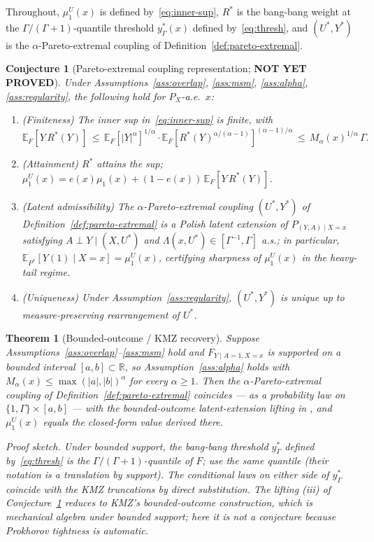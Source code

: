 \documentclass[11pt]{article}
\newcommand{\E}{\mathbb{E}}
\newcommand{\R}{\mathbb{R}}
\theoremstyle{definition}
\theoremstyle{plain}
\newtheorem{theorem}{Theorem}
\newtheorem{conjecture}{Conjecture}
\theoremstyle{remark}
\begin{document}
Throughout, $\mu_1^U(x)$ is defined by~\eqref{eq:inner-sup}, $R^*$ is the bang-bang weight at the $\Gamma/(\Gamma+1)$-quantile threshold $y_\Gamma^*(x)$ defined by~\eqref{eq:thresh}, and $(U^*, Y^*)$ is the $\alpha$-Pareto-extremal coupling of Definition~\ref{def:pareto-extremal}.

\begin{conjecture}[Pareto-extremal coupling representation; \textbf{NOT YET PROVED}]\label{conj:representation}
Under Assumptions~\ref{ass:overlap}, \ref{ass:msm}, \ref{ass:alpha}, \ref{ass:regularity}, the following hold for $P_X$-a.e.\ $x$:
\begin{enumerate}[label=(\roman*)]
  \item (Finiteness) The inner sup in~\eqref{eq:inner-sup} is finite, with
    \[ \E_F[Y\,R^*(Y)] \,\le\, \E_F[|Y|^\alpha]^{1/\alpha} \cdot \E_F\!\left[ R^*(Y)^{\alpha/(\alpha-1)} \right]^{(\alpha-1)/\alpha} \,\le\, M_\alpha(x)^{1/\alpha}\,\Gamma. \]
  \item (Attainment) $R^*$ attains the sup; $\mu_1^U(x) = e(x)\mu_1(x) + (1-e(x))\,\E_F[Y\,R^*(Y)]$.
  \item (Latent admissibility) The $\alpha$-Pareto-extremal coupling $(U^*, Y^*)$ of Definition~\ref{def:pareto-extremal} is a Polish latent extension of $P_{(Y, A) \mid X=x}$ satisfying $A \perp Y \mid (X, U^*)$ and $\Lambda(x, U^*) \in [\Gamma^{-1}, \Gamma]$ a.s.; in particular, $\E_{P^*}[Y(1) \mid X=x] = \mu_1^U(x)$, certifying sharpness of $\mu_1^U(x)$ in the heavy-tail regime.
  \item (Uniqueness) Under Assumption~\ref{ass:regularity}, $(U^*, Y^*)$ is unique up to measure-preserving rearrangement of $U^*$.
\end{enumerate}
\end{conjecture}

\begin{theorem}[Bounded-outcome / KMZ recovery]\label{thm:kmz-limit}
Suppose Assumptions~\ref{ass:overlap}--\ref{ass:msm} hold and $F_{Y \mid A=1, X=x}$ is supported on a bounded interval $[a, b] \subset \R$, so Assumption~\ref{ass:alpha} holds with $M_\alpha(x) \le \max(|a|, |b|)^\alpha$ for every $\alpha \ge 1$. Then the $\alpha$-Pareto-extremal coupling of Definition~\ref{def:pareto-extremal} coincides --- as a probability law on $\{1, \Gamma\} \times [a, b]$ --- with the bounded-outcome latent-extension lifting in \citet[Thm.~3.1, eq.~(7)]{KallusMaoZhou2019}, and $\mu_1^U(x)$ equals the closed-form value derived there.

\emph{Proof sketch.} Under bounded support, the bang-bang threshold $y_\Gamma^*$ defined by~\eqref{eq:thresh} is the $\Gamma/(\Gamma+1)$-quantile of $F$; \citet[eq.~(7)]{KallusMaoZhou2019} use the same quantile (their notation is a translation by support). The conditional laws on either side of $y_\Gamma^*$ coincide with the KMZ truncations by direct substitution. The lifting (iii) of Conjecture~\ref{conj:representation} reduces to KMZ's bounded-outcome construction, which is mechanical algebra under bounded support; here it is not a conjecture because Prokhorov tightness is automatic.
\end{theorem}
\end{document}
